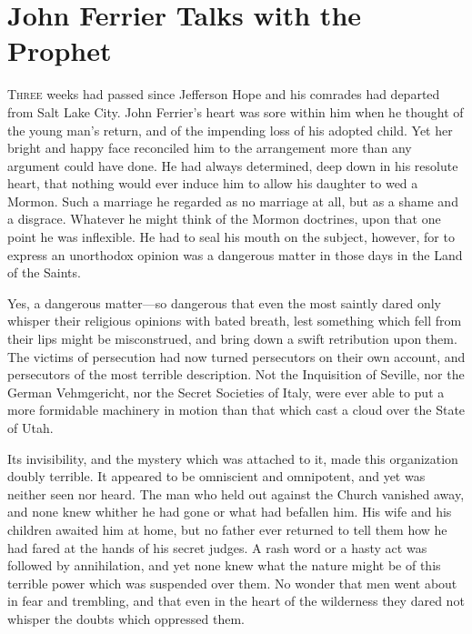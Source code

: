\chapter{John Ferrier Talks with the Prophet}
\lettrine{T}{hree} weeks had passed since Jefferson Hope and his comrades had departed from Salt Lake City. John Ferrier's heart was sore within him when he thought of the young man's return, and of the impending loss of his adopted child. Yet her bright and happy face reconciled him to the arrangement more than any argument could have done. He had always determined, deep down in his resolute heart, that nothing would ever induce him to allow his daughter to wed a Mormon. Such a marriage he regarded as no marriage at all, but as a shame and a disgrace. Whatever he might think of the Mormon doctrines, upon that one point he was inflexible. He had to seal his mouth on the subject, however, for to express an unorthodox opinion was a dangerous matter in those days in the Land of the Saints.

Yes, a dangerous matter—so dangerous that even the most saintly dared only whisper their religious opinions with bated breath, lest something which fell from their lips might be misconstrued, and bring down a swift retribution upon them. The victims of persecution had now turned persecutors on their own account, and persecutors of the most terrible description. Not the Inquisition of Seville, nor the German Vehmgericht, nor the Secret Societies of Italy, were ever able to put a more formidable machinery in motion than that which cast a cloud over the State of Utah.

Its invisibility, and the mystery which was attached to it, made this organization doubly terrible. It appeared to be omniscient and omnipotent, and yet was neither seen nor heard. The man who held out against the Church vanished away, and none knew whither he had gone or what had befallen him. His wife and his children awaited him at home, but no father ever returned to tell them how he had fared at the hands of his secret judges. A rash word or a hasty act was followed by annihilation, and yet none knew what the nature might be of this terrible power which was suspended over them. No wonder that men went about in fear and trembling, and that even in the heart of the wilderness they dared not whisper the doubts which oppressed them.

